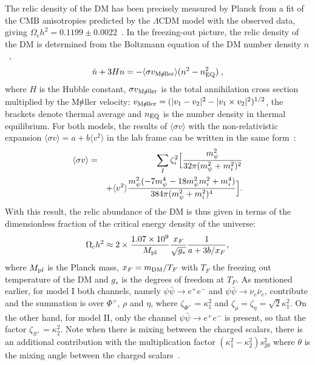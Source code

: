 \documentclass[aps,prd,letterpaper,showpacs,twocolumn,preprintnumbers,floatfix,superscriptaddress]{revtex4-1}
\begin{document}
The relic density of the DM has been precisely measured by Planck from a fit of 
the CMB anisotropies predicted by the $\Lambda \text{CDM}$ model with the observed data, 
giving $\Omega_{\text{c}} h^2 = 0.1199\pm 0.0022$~\cite{Ade:2015xua}.
%
In the freezing-out picture, the relic density of the DM is determined from the Boltzmann equation 
of the DM number density $n$~\cite{Gondolo:1990dk},
%
\begin{eqnarray}
\dot{n} + 3 Hn =- \langle \sigma v_{\rm M\slashed{o}ller} \rangle ( n^2 -n_{\rm EQ}^2 ) \; ,
\end{eqnarray}  
%
where $H $ is the Hubble constant, $\sigma v_{\rm M\slashed{o}ller}$ is the total annihilation cross section multiplied by  
the M$\slashed{\rm o}$ller velocity: $v_{\rm M\slashed{o}ller}=(|v_1 -v_2 |^2 -|v_1 \times v_2 |^2 )^{1/2}$, the brackets denote 
thermal average and $n_{\rm EQ}$ is the number density in thermal equilibrium. 
%
For both models, the results of $\langle\sigma v\rangle$ with the non-relativistic expansion $\langle \sigma v \rangle =a + b \langle v^2 \rangle$ in the lab frame can be written in the same form~\cite{Chao:2016lqd}:
%
\begin{eqnarray}
\langle \sigma v\rangle &=& \sum_I \zeta_i^2  \Big[ {m_\psi^2 \over 32 \pi (m_\psi^2 + {m}_{i}^2)^2 }  \nonumber \\
&& + \langle v^2 \rangle {m_\psi^2 (-7 m_\psi^4 -18 m_\psi^2 {m}_i^2 +{m}_i^4 )\over 384 \pi (m_\psi^2 + {m}_i^2)^4}\Big] .
\label{thermalaverage}
\end{eqnarray}
%
With this result, the relic abundance of the DM is thus given in terms of the dimensionless fraction of 
the critical energy density of the universe:
%
\begin{eqnarray}
  \Omega_c h^2 \approx 2 \times{1.07\times 10^9 \over M_{\text{pl}}} {x_F \over \sqrt{g_*} } {1 \over a + 3 b/x_F} ,
\end{eqnarray}
%
where $M_{\rm  pl}$ is the Planck mass, $x_F=m_{\rm DM}/T_F$ with
$T_F$ the freezing  out temperature of the DM and $g_*$ is the degrees of freedom at $T_F$.  
%
As mentioned earlier, for model I both channels, namely $ \psi \bar \psi \to e^+e^-$ and $\psi \bar \psi \to \nu_e \bar{\nu}_e$, contribute and the summation 
is over ${\Phi}^+$, $\rho$ and $\eta$, where $\zeta_{{\Phi}^+} = \kappa_1^2$ and
$\zeta_{\rho} = \zeta_{\eta} = \sqrt{2}\kappa_1^2$. 
%
On the other hand, for model II, 
only the channel $ \psi \bar \psi \to e^+ e^-$ is present, so that the factor
$\zeta_{{S}^+} = \kappa_2^2$. 
%
Note when there is mixing between the charged scalars, there is an 
additional contribution with the multiplication factor $(\kappa_1^2-\kappa_2^2) s_{2\theta}^2$ where 
$\theta$ is the mixing angle between the charged scalars~\cite{Chao:2016lqd}. 
\end{document}

